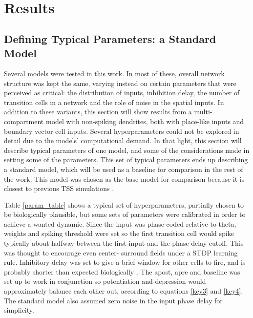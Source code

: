 \documentclass{article}
\begin{document}
    \newpage
    \section{Results} \label{Results}

    \subsection{Defining Typical Parameters: a Standard Model} \label{Standard model}
    Several models were tested in this work. In most of these, overall network structure was kept the same, varying instead on certain parameters that were perceived as critical: the distribution of inputs, inhibition delay, the number of transition cells in a network and the role of noise in the spatial inputs. In addition to these variants, this section will show results from a multi-compartment model with non-spiking dendrites, both with place-like inputs and boundary vector cell inputs. Several hyperparameters could not be explored in detail due to the models' computational demand. In that light, this section will describe typical parameters of one model, and some of the considerations made in setting some of the parameters. This set of typical parameters ends up describing a standard model, which will be used as a baseline for comparison in the rest of the work. This model was chosen as the base model for comparison because it is closest to previous TSS simulations \parencite{Waniek2017}.

    Table \ref{param_table} shows a typical set of hyperparameters, partially chosen to be biologically plausible, but some sets of parameters were calibrated in order to achieve a wanted dynamic. Since the input was phase-coded relative to theta, weights and spiking threshold were set so the first transition cell would spike typically about halfway between the first input and the phase-delay cutoff. This was thought to encourage even center- surround fields under a STDP learning rule. Inhibitory delay was set to give a brief window for other cells to fire, and is probably shorter than expected biologically \parencite{Buetfering2014}. The apost, apre and baseline was set up to work in conjunction so potentiation and depression would approximately balance each other out, according to equations \ref{key3} and \ref{key4}. The standard model also assumed zero noise in the input phase delay for simplicity.
\end{document}
